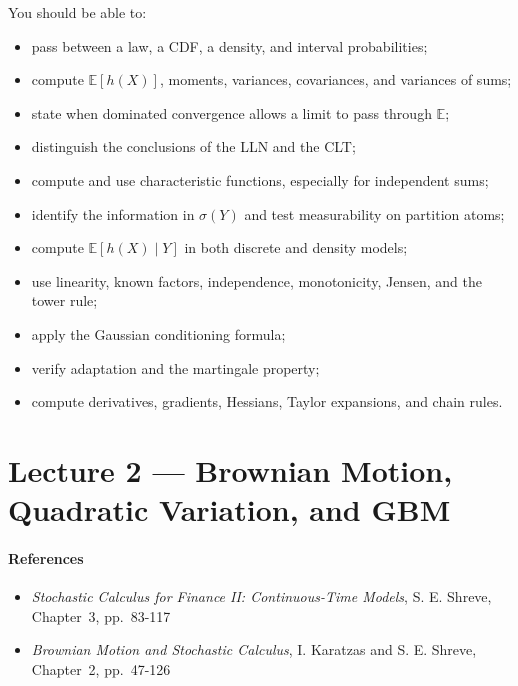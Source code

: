 \documentclass[11pt]{article}
\newcommand{\E}{\mathbb{E}}
\newcommand{\1}{\mathbf{1}}
\theoremstyle{plain}
\theoremstyle{definition}
\theoremstyle{remark}
\begin{document}
You should be able to:
\begin{itemize}[leftmargin=1.5em,itemsep=0.15em]
  \item pass between a law, a CDF, a density, and interval probabilities;
  \item compute $\E[h(X)]$, moments, variances, covariances, and variances of sums;
  \item state when dominated convergence allows a limit to pass through $\E$;
  \item distinguish the conclusions of the LLN and the CLT;
  \item compute and use characteristic functions, especially for independent sums;
  \item identify the information in $\sigma(Y)$ and test measurability on partition atoms;
  \item compute $\E[h(X)\mid Y]$ in both discrete and density models;
  \item use linearity, known factors, independence, monotonicity, Jensen, and the tower rule;
  \item apply the Gaussian conditioning formula;
  \item verify adaptation and the martingale property;
  \item compute derivatives, gradients, Hessians, Taylor expansions, and chain rules.
\end{itemize}


\section{Lecture 2 --- Brownian Motion, Quadratic Variation, and GBM}

\paragraph{References}

\begin{itemize}[leftmargin=1.4em]

\item \textit{Stochastic Calculus for Finance II: Continuous-Time Models}, S. E. Shreve, Chapter~3, pp.~83-117

\item \textit{Brownian Motion and Stochastic Calculus}, I. Karatzas and S. E. Shreve, Chapter~2, pp.~47-126

\end{itemize}
\end{document}
